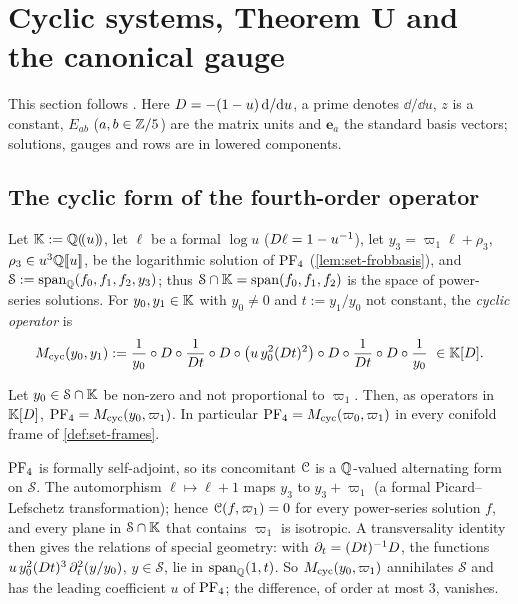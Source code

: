 \section{Cyclic systems, Theorem U and the canonical gauge}
\label{sec:gau}

This section follows . Here $D=-(1-u)\,\mathrm{d}/\mathrm{d} u$, a prime denotes $\dd/\dd u$, $z$ is a constant, $E_{ab}$ ($a,b\in\mathbb{Z}/5$) are the matrix units and $\mathbf e_a$ the standard basis vectors; solutions, gauges and rows are in lowered components.

\subsection{The cyclic form of the fourth-order operator}
\label{sec:gau-cyc}

Let $\mathbb{K}:=\mathbb{Q}(\!(u)\!)$, let $\ell$ be a formal $\log u$ ($D\ell=1-u^{-1}$), let $y_3=\varpi_1\ell+\rho_3$, $\rho_3\in u^3\mathbb{Q}[\![ u ]\!]$, be the logarithmic solution of $\mathrm{PF}_{4}$ (\cref{lem:set-frobbasis}), and $\mathcal S:=\operatorname{span}_{\mathbb{Q}}(f_0,f_1,f_2,y_3)$; thus $\mathcal S\cap\mathbb{K}=\operatorname{span}(f_0,f_1,f_2)$ is the space of power-series solutions. For $y_0,y_1\in\mathbb{K}$ with $y_0\neq0$ and $t:=y_1/y_0$ not constant, the \emph{cyclic operator} is
\[
M_{\mathrm{cyc}}(y_0,y_1):=\frac1{y_0}\circ D\circ\frac1{D t}\circ D\circ\bigl(u\,y_0^2(D t)^2\bigr)\circ D\circ\frac1{D t}\circ D\circ\frac1{y_0}\ \in\mathbb{K}[D].
\]

\begin{thm}
\label{thm:gau-cyc}
Let $y_0\in\mathcal S\cap\mathbb{K}$ be non-zero and not proportional to $\varpi_1$. Then, as operators in $\mathbb{K}[D]$, $\mathrm{PF}_{4}=M_{\mathrm{cyc}}(y_0,\varpi_1)$. In particular $\mathrm{PF}_{4}=M_{\mathrm{cyc}}(\varpi_0,\varpi_1)$ in every conifold frame of \cref{def:set-frames}.
\end{thm}

\begin{sketch}
$\mathrm{PF}_{4}$ is formally self-adjoint, so its concomitant $\mathcal{C}$ is a $\mathbb{Q}$-valued alternating form on $\mathcal S$. The automorphism $\ell\mapsto\ell+1$ maps $y_3$ to $y_3+\varpi_1$ (a formal Picard--Lefschetz transformation); hence $\mathcal{C}(f,\varpi_1)=0$ for every power-series solution $f$, and every plane in $\mathcal S\cap\mathbb{K}$ that contains $\varpi_1$ is isotropic. A transversality identity then gives the relations of special geometry: with $\partial_t=(D t)^{-1}D$, the functions $u\,y_0^2(D t)^3\,\partial_t^2(y/y_0)$, $y\in\mathcal S$, lie in $\operatorname{span}_{\mathbb{Q}}(1,t)$. So $M_{\mathrm{cyc}}(y_0,\varpi_1)$ annihilates $\mathcal S$ and has the leading coefficient $u$ of $\mathrm{PF}_{4}$; the difference, of order at most $3$, vanishes.
\end{sketch}

